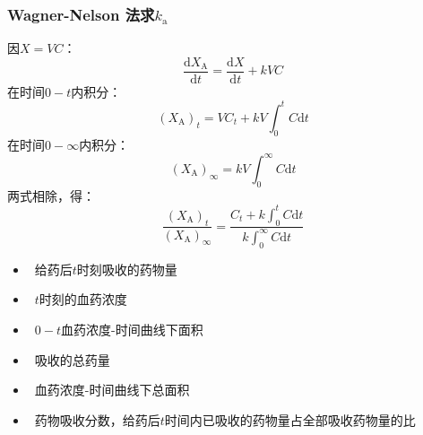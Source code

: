 \documentclass[dvipsnames, svgnames, x11names]{beamer}
\begin{document}
\begin{frame}
    \frametitle{Wagner-Nelson 法求$k_\mathrm{a}$}
    \begin{minipage}{0.48\linewidth}
        因$X=VC$：
    \[
        \frac{\mathrm{d}X_{\mathrm{A}}}{\mathrm{d}t}=\frac{\mathrm{d}X}{\mathrm{d}t}+kVC
    \]
    在时间$0-t$内积分：
    \[
        (X_{\mathrm{A}})_{t}=VC_{t}+kV\int_{0}^{t}C\mathrm{d}t
    \]
    在时间$0-\infty$内积分：
    \[
        (X_{\mathrm{A}})_{\infty}=kV\int_{0}^{\infty}C\mathrm{d}t
    \]
    两式相除，得：
    \[
        \frac{(X_{\mathrm{A}})_{t}}{(X_{\mathrm{A}})_{\infty}}=\frac{C_{t}+k\int_{0}^{t}C\mathrm{d}t}{k\int_{0}^{\infty}C\mathrm{d}t}
    \]
    \end{minipage}\hfill
    \begin{minipage}{0.48\linewidth}
        \begin{itemize}
          \item[$(X_{\mathrm{A}})_{t}$] \ 给药后$t$时刻吸收的药物量
          \item[$C_{t}$：] \ $t$时刻的血药浓度
          \item[$\int_{0}^{t}C\mathrm{d}t$：] \ $0-t$血药浓度-时间曲线下面积
          \item[$(X_{\mathrm{A}})_{\infty}$：] \ 吸收的总药量
          \item[$\int_{0}^{\infty}C\mathrm{d}t$：] \ 血药浓度-时间曲线下总面积
          \item[$\frac{(X_{\mathrm{A}})_{t}}{(X_{\mathrm{A}})_{\infty}}$：] \ 药物吸收分数，给药后$t$时间内已吸收的药物量占全部吸收药物量的比
        \end{itemize}
    \end{minipage}
    
\end{frame}
\end{document}
